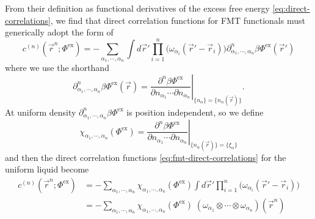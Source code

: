 From their definition as functional derivatives of the excess free energy \eqref{eq:direct-correlations}, we find that direct correlation functions for FMT functionals must generically adopt the form of \cite{RosenfeldPRL1989}
\begin{equation}\label{eq:fmt-direct-correlations}
  c^{(n)}(\vec{r}^n; \Phi^\mathrm{ex})
  =
  - \sum_{\alpha_1, \cdots, \alpha_n}
  \int d\vec{r}'
  \prod_{i=1}^n \Big( \omega_{\alpha_i}(\vec{r}' - \vec{r}_i) \Big)
  \partial^n_{\alpha_1, \cdots, \alpha_n} \beta \Phi^\mathrm{ex}(\vec{r}')
\end{equation}
where we use the shorthand 
\begin{equation*}
  \partial^n_{\alpha_1, \cdots, \alpha_n} \beta \Phi^\mathrm{ex}(\vec{r}) =
  \left.
  \frac{\partial^n \beta \Phi^\mathrm{ex}}{\partial n_{\alpha_1} \cdots \partial n_{\alpha_n}}
  \right|_{\{n_\alpha\} = \{n_\alpha(\vec{r})\}}.
\end{equation*}
At uniform density $\partial^n_{\alpha_1, \cdots, \alpha_n} \beta \Phi^\mathrm{ex}$ is position independent, so we define
\begin{equation}
  \chi_{\alpha_1, \cdots, \alpha_n}(\Phi^\mathrm{ex})
  =
  \left.
  \frac{\partial^n \beta \Phi^\mathrm{ex}}{\partial n_{\alpha_1} \cdots \partial n_{\alpha_n}}
  \right|_{\{n_\alpha(\vec{r})\} = \{\xi_\alpha\}}
\end{equation}
and then the direct correlation functions \eqref{eq:fmt-direct-correlations} for the uniform liquid become \cite{RosenfeldJCP1990}
\begin{equation}\label{eq:fmt-direct-correlations-uniform-density}
  \begin{split}
    c^{(n)}(\vec{r}^n; \Phi^\mathrm{ex})
    &=
    - \sum_{\alpha_1, \cdots, \alpha_n}
    \chi_{\alpha_1, \cdots, \alpha_n}(\Phi^\mathrm{ex})
    \int d\vec{r}'
    \prod_{i=1}^n \Big( \omega_{\alpha_i}(\vec{r}' - \vec{r}_i) \Big)
    \\ &=
    - \sum_{\alpha_1, \cdots, \alpha_n}
    \chi_{\alpha_1, \cdots, \alpha_n}(\Phi^\mathrm{ex}) \;
    (\omega_{\alpha_1} \otimes \cdots \otimes \omega_{\alpha_n})
    (\vec{r}^n)
  \end{split}
\end{equation}

